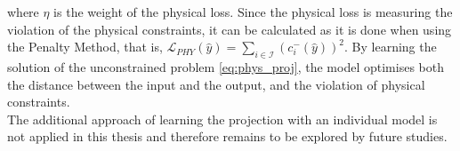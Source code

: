where $\eta$ is the weight of the physical loss. Since the physical loss is measuring the violation of the physical constraints, it can be calculated as it is done when using the Penalty Method, that is, $\mathcal{L}_{PHY}(\hat{y}) = \sum_{i \in \mathcal{I}} (c_i^{-}(\hat{y}))^2$. By learning the solution of the unconstrained problem \eqref{eq:phys_proj}, the model optimises both the distance between the input and the output, and the violation of physical constraints.\\
\indent The additional approach of learning the projection with an individual model is not applied in this thesis and therefore remains to be explored by future studies.

\clearpage

